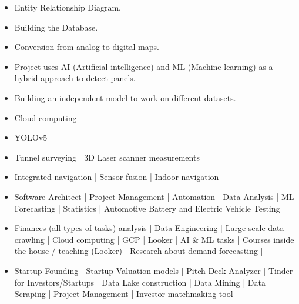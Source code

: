 \documentclass[10pt,a4paper]{altacv}
\begin{document}
\newpage
{}
\begin{itemize}
\item Entity Relationship Diagram.
\item Building the Database.
\item Conversion from analog to digital maps.
\end{itemize}

\begin{itemize}
\item Project uses AI (Artificial intelligence) and ML (Machine learning) as 
a hybrid approach to detect panels. 
\item Building an independent model to work on different datasets.
\item Cloud computing
\item YOLOv5
\end{itemize}


\begin{itemize}
\item Tunnel surveying | 3D Laser scanner measurements
\end{itemize}


\begin{itemize}
\item Integrated navigation | Sensor fusion | Indoor navigation
\end{itemize}

\begin{itemize}
\item Software Architect | Project Management | Automation | Data Analysis | ML Forecasting | Statistics | Automotive Battery and Electric Vehicle Testing
\end{itemize}

\begin{itemize}
\item Finances (all types of tasks) analysis | Data Engineering | Large scale data crawling  | Cloud computing | GCP | Looker | AI \& ML tasks | Courses inside the house / teaching (Looker) | Research about demand forecasting |
\end{itemize}

\begin{itemize}
\item Startup Founding | Startup Valuation models | Pitch Deck Analyzer | Tinder for Investors/Startups | Data Lake construction | Data Mining | Data Scraping | Project Management | Investor matchmaking tool
\end{itemize}



\clearpage
\end{document}

